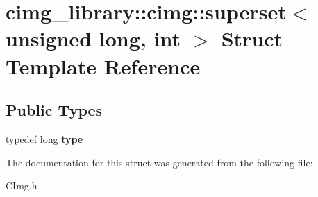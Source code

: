 \hypertarget{structcimg__library_1_1cimg_1_1superset_3_01unsigned_01long_00_01int_01_4}{\section{cimg\-\_\-library\-:\-:cimg\-:\-:superset$<$ unsigned long, int $>$ Struct Template Reference}
\label{structcimg__library_1_1cimg_1_1superset_3_01unsigned_01long_00_01int_01_4}
}
\subsection*{Public Types}
\begin{DoxyCompactItemize}
\item 
\hypertarget{structcimg__library_1_1cimg_1_1superset_3_01unsigned_01long_00_01int_01_4_ac0d2d0728b98d4db345edb66b27efa39}{typedef long {\bfseries type}}\label{structcimg__library_1_1cimg_1_1superset_3_01unsigned_01long_00_01int_01_4_ac0d2d0728b98d4db345edb66b27efa39}

\end{DoxyCompactItemize}


The documentation for this struct was generated from the following file\-:\begin{DoxyCompactItemize}
\item 
C\-Img.\-h\end{DoxyCompactItemize}
